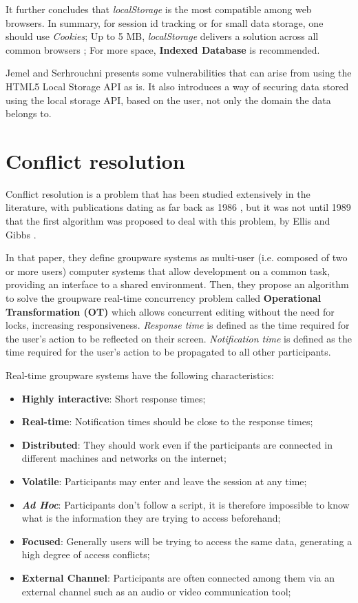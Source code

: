 It further concludes that \textit{localStorage} is the most compatible among web browsers. In summary, for session id tracking or for small data storage, one should use \textit{Cookies}; Up to 5 MB, \textit{localStorage} delivers a solution across all common browsers \cite{webstorage-w3c}; For more space, \textbf{Indexed Database} is recommended.

Jemel and Serhrouchni \cite{Jemel2014} presents some vulnerabilities that can arise from using the HTML5 Local Storage API as is. It also introduces a way of securing data stored using the local storage API, based on the user, not only the domain the data belongs to.


\section{Conflict resolution}\label{sec:conflict-res-sota}

Conflict resolution is a problem that has been studied extensively in the literature, with publications dating as far back as 1986 \cite{Greif1986}, but it was not until 1989 that the first algorithm was proposed to deal with this problem, by Ellis and Gibbs \cite{Ellis1989}.

In that paper, they define groupware systems as multi-user (i.e. composed of two or more users) computer systems that allow development on a common task, providing an interface to a shared environment. Then, they propose an algorithm to solve the groupware real-time concurrency problem called \textbf{Operational Transformation (OT)} which allows concurrent editing without the need for locks, increasing responsiveness. \textit{Response time} is defined as the time required for the user's action to be reflected on their screen. \textit{Notification time} is defined as the time required for the user's action to be propagated to all other participants.

Real-time groupware systems have the following characteristics:

\begin{itemize}
    \item \textbf{Highly interactive}: Short response times;
    \item \textbf{Real-time}: Notification times should be close to the response times;
    \item \textbf{Distributed}: They should work even if the participants are connected in different machines and networks on the internet;
    \item \textbf{Volatile}: Participants may enter and leave the session at any time;
    \item \textbf{\textit{Ad Hoc}}: Participants don't follow a script, it is therefore impossible to know what is the information they are trying to access beforehand;
    \item \textbf{Focused}: Generally users will be trying to access the same data, generating a high degree of access conflicts;
    \item \textbf{External Channel}: Participants are often connected among them via an external channel such as an audio or video communication tool;
\end{itemize}

